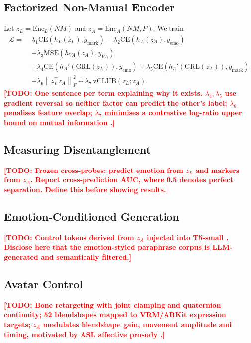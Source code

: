 \documentclass[conference]{IEEEtran}
\newcommand{\TODO}[1]{\textcolor{red}{\textbf{[TODO: #1]}}}
\begin{document}
\subsection{Factorized Non-Manual Encoder}
Let $z_L = \mathrm{Enc}_L(NM)$ and $z_A = \mathrm{Enc}_A(NM, P)$. We train
\begin{align}
\mathcal{L} =\;& \lambda_1 \mathrm{CE}\!\left(h_L(z_L), y_{\text{mark}}\right)
              + \lambda_2 \mathrm{CE}\!\left(h_A(z_A), y_{\text{emo}}\right) \nonumber\\
             &+ \lambda_3 \mathrm{MSE}\!\left(h_{VA}(z_A), y_{VA}\right) \nonumber\\
             &+ \lambda_4 \mathrm{CE}\!\left(h_A'(\mathrm{GRL}(z_L)), y_{\text{emo}}\right)
              + \lambda_5 \mathrm{CE}\!\left(h_L'(\mathrm{GRL}(z_A)), y_{\text{mark}}\right)
              \nonumber\\
             &+ \lambda_6 \left\lVert z_L^{\top} z_A \right\rVert_F^2
              + \lambda_7\, \mathrm{vCLUB}(z_L; z_A).
\label{eq:loss}
\end{align}
\TODO{One sentence per term explaining why it exists. $\lambda_4,\lambda_5$ use gradient reversal
\cite{ganin2015dann} so neither factor can predict the other's label; $\lambda_6$ penalises feature
overlap; $\lambda_7$ minimises a contrastive log-ratio upper bound on mutual information
\cite{cheng2020club}.}

\subsection{Measuring Disentanglement}
\TODO{Frozen cross-probes: predict emotion from $z_L$ and markers from $z_A$. Report
cross-prediction AUC, where 0.5 denotes perfect separation. Define this before showing results.}

\subsection{Emotion-Conditioned Generation}
\TODO{Control tokens derived from $z_A$ injected into T5-small \cite{raffel2020t5}.
\textbf{Disclose here} that the emotion-styled paraphrase corpus is LLM-generated and
semantically filtered.}

\subsection{Avatar Control}
\TODO{Bone retargeting with joint clamping and quaternion continuity; 52 blendshapes mapped to
VRM/ARKit expression targets; $z_A$ modulates blendshape gain, movement amplitude and timing,
motivated by ASL affective prosody \cite{reilly1992affective}.}
\end{document}
